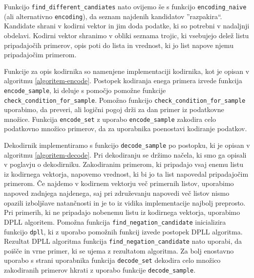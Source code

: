 \documentclass[12pt,a4paper,twoside]{article}
\theoremstyle{definition} %
\theoremstyle{plain} %
\numberwithin{equation}{section}  %
\begin{document}
Funkcijo \texttt{find\_different\_candiates} nato ovijemo še s funkcijo \texttt{encoding\_naive} (ali alternativno \texttt{encoding}), da seznam najdenih kandidatov ''razpakira``.
Kandidate shrani v kodirni vektor in jim doda podatke, ki so potrebni v nadaljnji obdelavi. %
Kodirni vektor shranimo v obliki seznama trojic, ki vsebujejo delež listu pripadajočih primerov, opis poti do lista in vrednost, ki jo list napove njemu pripadajočim primerom.





Funkcije za opis kodirnika so namenjene implementaciji kodirnika, kot je opisan v algoritmu \ref{algoritem-encode}.
Postopek kodiranja enega primera izvede funkcija \texttt{encode\_sample}, ki deluje s pomočjo pomožne funkcije \texttt{check\_condition\_for\_sample}.
Pomožno funkcijo \texttt{check\_condition\_for\_sample} uporabimo, da preveri, ali logični pogoj drži za dan primer iz podatkovne množice.
Funkcija \texttt{encode\_set} z uporabo \texttt{encode\_sample} zakodira celo podatkovno množico primerov, da za uporabnika poenostavi kodiranje podatkov.



Dekodirnik implementiramo s funkcijo \texttt{decode\_sample} po postopku, ki je opisan v algoritmu \ref{algoritem-decode}.
Pri dekodiranju se držimo načela, ki smo ga opisali v poglavju o dekodirniku.
Zakodiranim primerom, ki pripadajo vsaj enemu listu iz kodirnega vektorja, napovemo vrednost, ki bi jo ta list napovedal pripadajočim primerom.
Če najdemo v kodirnem vektorju več primernih listov, uporabimo napoved zadnjega najdenega, 
saj pri združevanju napovedi več listov nismo opazili izboljšave natančnosti in je to iz vidika implementacije najbolj preprosto.
Pri primerih, ki ne pripadajo nobenemu listu iz kodirnega vektorja, uporabimo DPLL algoritem. %
Pomožna funkcija \texttt{find\_negation\_candidate} inicializira funkcijo \texttt{dpll}, ki z uporabo pomožnih funkcij izvede postopek DPLL algoritma. %
Rezultat DPLL algoritma funkcija \texttt{find\_negation\_candidate} nato uporabi, da poišče in vrne primer, ki se ujema z rezultatom algoritma.
Za bolj enostavno uporabo s strani uporabnika funkcija \texttt{decode\_set} dekodira celo množico zakodiranih primerov hkrati z uporabo funkcije \texttt{decode\_sample}.
\end{document}
